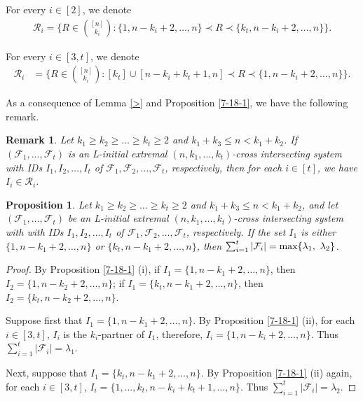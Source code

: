 \documentclass[a4paper,11pt]{article}
\newtheorem{proposition}[theorem]{Proposition}
\newtheorem{remark}[theorem]{Remark}
\begin{document}
For every $i\in [2]$, we denote
\begin{align*}
\mathcal{R}_i=\Bigg\{R\in {[n]\choose k_i}:  \{1, n-k_i+2, \dots, n\} \prec R \prec \{k_t, n-k_i+2, \dots, n\}\Bigg\}.
\end{align*}

 For every $i\in[3, t]$, we denote
 \begin{align*}
\mathcal{R}_i&=\Bigg\{ R\in {[n]\choose k_i}: [k_t]\cup[ n-k_i+k_t+1, n] \prec R \prec \{1, n-k_i+2, \dots, n\}\Bigg\}.
\end{align*}

As a consequence of Lemma \ref{>} and Proposition \ref{7-18-1}, we have the following remark.

\begin{remark}\label{NEW4}
Let $k_1\geq k_2\geq\dots\geq k_t\geq 2$ and $k_1+k_3\leq n <k_1+k_2$. If $(\mathcal{F}_1, \dots, \mathcal{F}_t)$ is an L-initial extremal $(n, k_1, \dots, k_t)$-cross intersecting system with IDs $I_1, I_2, \dots, I_t$ of $\mathcal{F}_1, \mathcal{F}_2, \dots, \mathcal{F}_t$, respectively, then  for each $i\in [t]$,  we have $I_i \in \mathcal{R}_i$.
\end{remark}


\begin{proposition}\label{prop2.4}
Let $k_1\geq k_2\geq\dots\geq k_t\geq 2$ and $k_1+k_3\leq n <k_1+k_2$, and
let $(\mathcal{F}_1, \dots, \mathcal{F}_t)$ be an L-initial extremal $(n, k_1, \dots, k_t)$-cross intersecting system with with IDs $I_1, I_2, \dots, I_t$ of $\mathcal{F}_1, \mathcal{F}_2, \dots, \mathcal{F}_t$, respectively.
If the set $I_1$ is either $\{1, n-k_1+2, \dots, n\}$ or $\{k_t, n-k_1+2, \dots, n\}$, then $\sum_{i=1}^t|\mathcal{F}_i|= \textup{max}\{\lambda_1, \,\, \lambda_2\}$.
\end{proposition}

\begin{proof}
By Proposition \ref{7-18-1} (i), if $I_1=\{1, n-k_1+2, \dots, n\}$, then $I_2=\{1, n-k_2+2, \dots, n\}$; if $I_1=\{k_t, n-k_1+2, \dots, n\}$, then $I_2=\{k_t, n-k_2+2, \dots, n\}$.

 Suppose first that $I_1=\{1, n-k_1+2, \dots, n\}$.
 By Proposition \ref{7-18-1} (ii), for each $i\in [3, t]$, $I_i$ is the $k_i$-partner of $I_1$, therefore, $I_i=\{1, n-k_i+2, \dots, n\}$.
Thus $\sum_{i=1}^t|\mathcal{F}_i|=\lambda_1$.

Next, suppose that  $I_1=\{k_t, n-k_1+2, \dots, n\}$.  By Proposition \ref{7-18-1} (ii) again, for each $i\in [3, t]$, $I_i=\{1, \dots, k_t, n-k_i+k_t+1, \dots, n\}$.
 Thus $\sum_{i=1}^t|\mathcal{F}_i|=\lambda_2$.
\end{proof}
\end{document}
